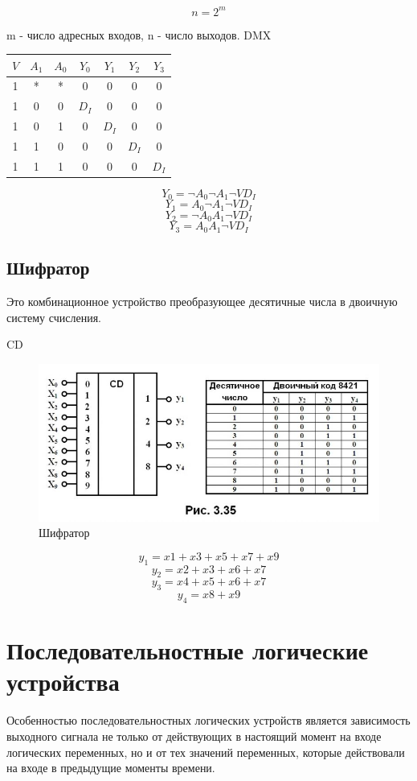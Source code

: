 \documentclass[a4paper]{article}
\begin{document}
$$ n = 2^m $$

m - число адресных входов, n - число выходов.
DMX

\begin{table}[ht]
\centering
\begin{tabular}{|c|c|c|c|c|c|c|}
\hline
$V$ & $A_1$ & $A_0$ & $Y_0$ & $Y_1$ & $Y_2$ & $Y_3$\\
\hline
1 & * & * & 0 & 0 & 0 & 0 \\
1 & 0 & 0 & $D_I$ & 0 & 0 & 0 \\
1 & 0 & 1 & 0 & $D_I$ & 0 & 0 \\
1 & 1 & 0 & 0 & 0 & $D_I$ & 0 \\
1 & 1 & 1 & 0 & 0 & 0 & $D_I$ \\
\hline
\end{tabular}
\end{table}
    
$$ Y_0 = \neg A_0\neg A_1\neg VD_I $$
$$ Y_1 = A_0\neg A_1\neg VD_I $$
$$ Y_2 = \neg A_0A_1\neg VD_I $$
$$ Y_3 = A_0A_1\neg VD_I $$

\subsection{Шифратор}
Это комбинационное устройство преобразующее десятичные числа в двоичную систему счисления.

CD
\begin{figure}[ht]
    \centering
    \includegraphics[width=\linewidth/3]{CD.jpg}
    \caption{Шифратор}
\end{figure}

$$ y_1 = x1 + x3 + x5 + x7 + x9 $$
$$ y_2 = x2 + x3 + x6 + x7 $$
$$ y_3 = x4 + x5 + x6 + x7 $$
$$ y_4 = x8 + x9 $$

\section{Последовательностные логические устройства}
Особенностью последовательностных логических устройств является зависимость выходного сигнала не только от действующих в настоящий момент на входе логических переменных, но и от тех значений переменных, которые действовали на входе в предыдущие моменты времени. 
\end{document}
